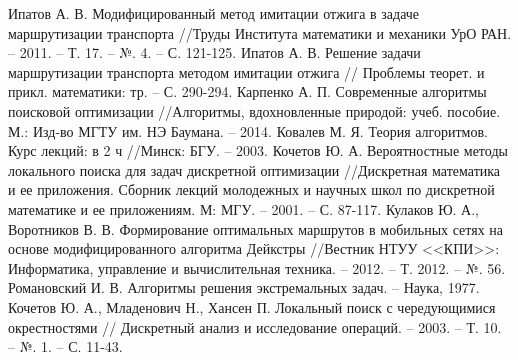 \begin{thebibliography}{10}
     Ипатов А. В. Модифицированный метод имитации отжига в задаче маршрутизации 
        транспорта //Труды Института математики и механики УрО РАН. -- 2011. -- Т. 17. -- №. 4. -- С. 121-125.
     Ипатов А. В. Решение задачи маршрутизации транспорта методом имитации отжига //
        Проблемы теорет. и прикл. математики: тр. -- С. 290-294.
     Карпенко А. П. Современные алгоритмы поисковой оптимизации //Алгоритмы, 
        вдохновленные природой: учеб. пособие. М.: Изд-во МГТУ им. НЭ Баумана. -- 2014.
     Ковалев М. Я. Теория алгоритмов. Курс лекций: в 2 ч //Минск: БГУ. -- 2003.
     Кочетов Ю. А. Вероятностные методы локального поиска для задач дискретной 
        оптимизации //Дискретная математика и ее приложения. Сборник лекций молодежных и научных школ 
        по дискретной математике и ее приложениям. М: МГУ. -- 2001. -- С. 87-117.
     Кулаков Ю. А., Воротников В. В. Формирование оптимальных маршрутов в мобильных сетях 
        на основе модифицированного алгоритма Дейкстры //Вестник НТУУ <<КПИ>>: Информатика, управление 
        и вычислительная техника. -- 2012. -- Т. 2012. -- №. 56.
     Романовский И. В. Алгоритмы решения экстремальных задач. -- Наука, 1977.
     Кочетов Ю. А., Младенович Н., Хансен П. Локальный поиск с чередующимися окрестностями //
        Дискретный анализ и исследование операций. -- 2003. -- Т. 10. -- №. 1. -- С. 11-43.

\end{thebibliography}

\pagestyle{plain}